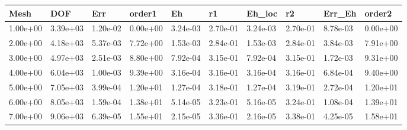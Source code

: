 \begin{tabular}{llllllllll}
Mesh & DOF & Err & order1 & Eh & r1 & Eh_loc & r2 & Err_Eh & order2 \\ 
\hline 
1.00e+00 & 3.39e+03 & 1.20e-02 & 0.00e+00 & 3.24e-03 & 2.70e-01 & 3.24e-03 & 2.70e-01 & 8.78e-03 & 0.00e+00 \\ 
2.00e+00 & 4.18e+03 & 5.37e-03 & 7.72e+00 & 1.53e-03 & 2.84e-01 & 1.53e-03 & 2.84e-01 & 3.84e-03 & 7.91e+00 \\ 
3.00e+00 & 4.97e+03 & 2.51e-03 & 8.80e+00 & 7.92e-04 & 3.15e-01 & 7.92e-04 & 3.15e-01 & 1.72e-03 & 9.31e+00 \\ 
4.00e+00 & 6.04e+03 & 1.00e-03 & 9.39e+00 & 3.16e-04 & 3.16e-01 & 3.16e-04 & 3.16e-01 & 6.84e-04 & 9.40e+00 \\ 
5.00e+00 & 7.05e+03 & 3.99e-04 & 1.20e+01 & 1.27e-04 & 3.18e-01 & 1.27e-04 & 3.19e-01 & 2.72e-04 & 1.20e+01 \\ 
6.00e+00 & 8.05e+03 & 1.59e-04 & 1.38e+01 & 5.14e-05 & 3.23e-01 & 5.16e-05 & 3.24e-01 & 1.08e-04 & 1.39e+01 \\ 
7.00e+00 & 9.06e+03 & 6.39e-05 & 1.55e+01 & 2.15e-05 & 3.36e-01 & 2.16e-05 & 3.38e-01 & 4.25e-05 & 1.58e+01 \\ 
\hline 
\end{tabular}